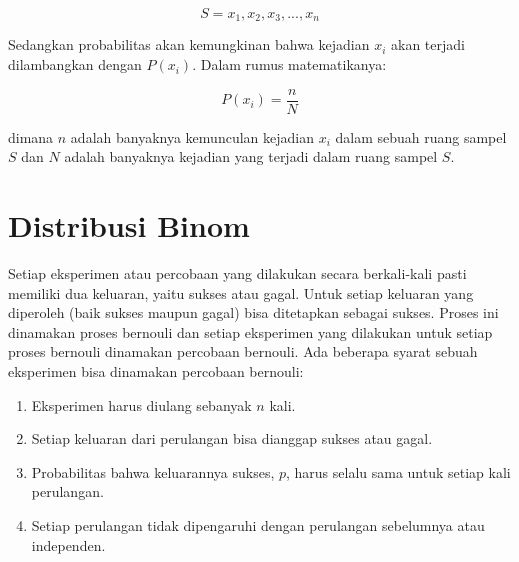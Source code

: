\begin{displaymath}
	S = {x_1, x_2, x_3, ..., x_n}
\end{displaymath}

Sedangkan probabilitas akan kemungkinan bahwa kejadian \begin{math}x_i\end{math} akan terjadi dilambangkan dengan \begin{math}P(x_i)\end{math}. Dalam rumus matematikanya:

\begin{displaymath}
	P(x_i) = \frac{n}{N}
\end{displaymath}

\noindent dimana \begin{math}n\end{math} adalah banyaknya kemunculan kejadian \begin{math}x_i\end{math} dalam sebuah ruang sampel \begin{math}S\end{math} dan \begin{math}N\end{math} adalah banyaknya kejadian yang terjadi dalam ruang sampel \begin{math}S\end{math}.

\section{Distribusi Binom}
Setiap eksperimen atau percobaan yang dilakukan secara berkali-kali pasti memiliki dua keluaran, yaitu sukses atau gagal. Untuk setiap keluaran yang diperoleh (baik sukses maupun gagal) bisa ditetapkan sebagai sukses. Proses ini dinamakan proses bernouli dan setiap eksperimen yang dilakukan untuk setiap proses bernouli dinamakan percobaan bernouli. Ada beberapa syarat sebuah eksperimen bisa dinamakan percobaan bernouli:
\begin{enumerate}
	\item Eksperimen harus diulang sebanyak \begin{math}n\end{math} kali.
	\item Setiap keluaran dari perulangan bisa dianggap sukses atau gagal.
	\item Probabilitas bahwa keluarannya sukses, \begin{math}p\end{math}, harus selalu sama untuk setiap kali perulangan.
	\item Setiap perulangan tidak dipengaruhi dengan perulangan sebelumnya atau independen.
\end{enumerate}

